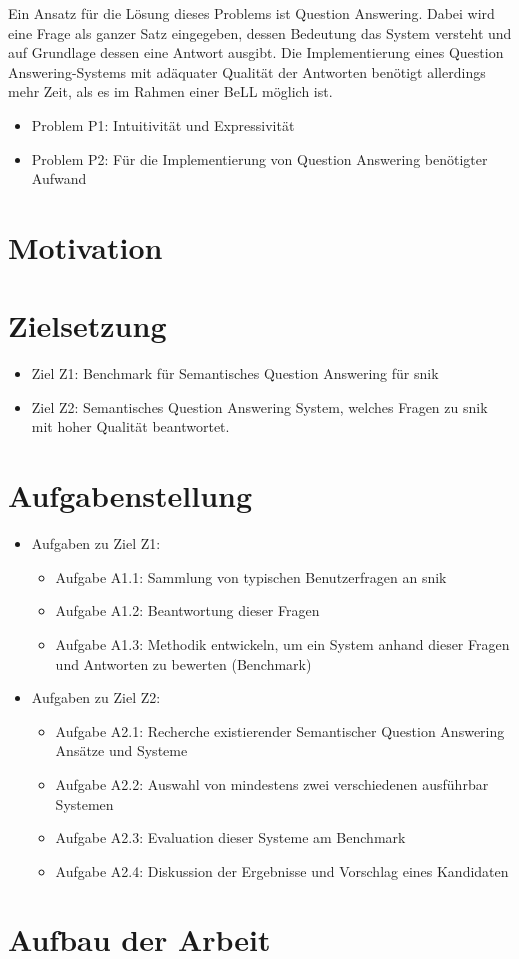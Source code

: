Ein Ansatz für die Lösung dieses Problems ist Question Answering.
Dabei wird eine Frage als ganzer Satz eingegeben, dessen Bedeutung das System versteht und auf Grundlage dessen eine Antwort ausgibt.
Die Implementierung eines Question Answering-Systems mit adäquater Qualität der Antworten benötigt allerdings mehr Zeit, als es im Rahmen einer BeLL möglich ist.

\begin{itemize}
	\item Problem P1: Intuitivität und Expressivität
	\item Problem P2: Für die Implementierung von Question Answering benötigter Aufwand
\end{itemize}


\section{Motivation}


\section{Zielsetzung}\label{sec:zielsetzung}
	\begin{itemize}
		\item Ziel Z1: Benchmark für Semantisches Question Answering für \ac{snik}
		\item Ziel Z2: Semantisches Question Answering System, welches Fragen zu \ac{snik} mit hoher Qualität beantwortet.
	\end{itemize}
\section{Aufgabenstellung}

\begin{itemize}
	\item Aufgaben zu Ziel Z1:
	\begin{itemize}
		\item Aufgabe A1.1: Sammlung von typischen Benutzerfragen an \ac{snik}
		\item Aufgabe A1.2: Beantwortung dieser Fragen
		\item Aufgabe A1.3: Methodik entwickeln, um ein System anhand dieser Fragen und Antworten zu bewerten (Benchmark)
	\end{itemize}
	\item Aufgaben zu Ziel Z2:
	\begin{itemize}
		\item Aufgabe A2.1: Recherche existierender Semantischer Question Answering Ansätze und Systeme
		\item Aufgabe A2.2: Auswahl von mindestens zwei verschiedenen ausführbar Systemen
		\item Aufgabe A2.3: Evaluation dieser Systeme am Benchmark
		\item Aufgabe A2.4: Diskussion der Ergebnisse und Vorschlag eines Kandidaten
	\end{itemize}
\end{itemize}

\section{Aufbau der Arbeit}
